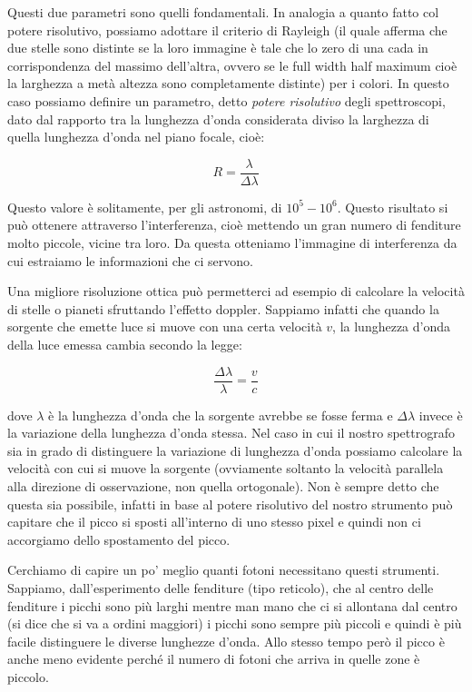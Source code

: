 Questi due parametri sono quelli fondamentali. In analogia a quanto fatto col potere risolutivo, possiamo adottare il criterio di Rayleigh (il quale afferma che due stelle sono distinte se la loro immagine è tale che lo zero di una cada in corrispondenza del massimo dell'altra, ovvero se le full width half maximum cioè la larghezza a metà altezza sono completamente distinte) per i colori. In questo caso possiamo definire un parametro, detto \textit{potere risolutivo} degli spettroscopi, dato dal rapporto tra la lunghezza d'onda considerata diviso la larghezza di quella lunghezza d'onda nel piano focale, cioè:

$$R=\frac{\lambda}{\Delta \lambda}$$

Questo valore è solitamente, per gli astronomi, di $10^5 - 10^6$. Questo risultato si può ottenere attraverso l'interferenza, cioè mettendo un gran numero di fenditure molto piccole, vicine tra loro. Da questa otteniamo l'immagine di interferenza da cui estraiamo le informazioni che ci servono.

Una migliore risoluzione ottica può permetterci ad esempio di calcolare la velocità di stelle o pianeti sfruttando l'effetto doppler. Sappiamo infatti che quando la sorgente che emette luce si muove con una certa velocità $v$, la lunghezza d'onda della luce emessa cambia secondo la legge:

$$\frac{\Delta \lambda}{\lambda} = \frac{v}{c}$$

dove $\lambda$ è la lunghezza d'onda che la sorgente avrebbe se fosse ferma e $\Delta \lambda$ invece è la variazione della lunghezza d'onda stessa. Nel caso in cui il nostro spettrografo sia in grado di distinguere la variazione di lunghezza d'onda possiamo calcolare la velocità con cui si muove la sorgente (ovviamente soltanto la velocità parallela alla direzione di osservazione, non quella ortogonale). Non è sempre detto che questa sia possibile, infatti in base al potere risolutivo del nostro strumento può capitare che il picco si sposti all'interno di uno stesso pixel e quindi non ci accorgiamo dello spostamento del picco.

Cerchiamo di capire un po' meglio quanti fotoni necessitano questi strumenti. Sappiamo, dall'esperimento delle fenditure (tipo reticolo), che al centro delle fenditure i picchi sono più larghi mentre man mano che ci si allontana dal centro (si dice che si va a ordini maggiori) i picchi sono sempre più piccoli e quindi è più facile distinguere le diverse lunghezze d'onda. Allo stesso tempo però il picco è anche meno evidente perché il numero di fotoni che arriva in quelle zone è piccolo. 

